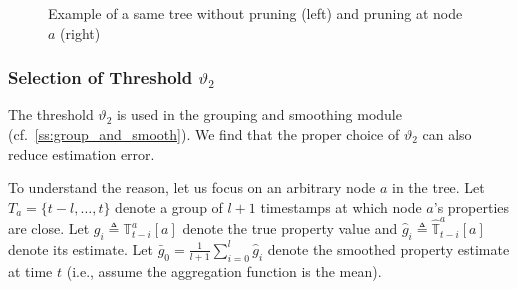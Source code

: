 \documentclass[acmsmall]{acmart}
\newcommand{\Tree}{\mathbb{T}}
\newcommand{\AT}{\Tree^a}
\newcommand{\hAT}{\hat{\Tree}^a}
\begin{document}
\begin{figure}[htp]


  \caption{Example of a same tree without pruning (left) and pruning at node $a$
  (right)}
  \label{fig:branch_of_tree}
\end{figure}




\subsubsection{Selection of Threshold $\vartheta_2$}

The threshold $\vartheta_2$ is used in the grouping and smoothing module
(cf.~\cref{ss:group_and_smooth}).
We find that the proper choice of $\vartheta_2$ can also reduce estimation error.

To understand the reason, let us focus on an arbitrary node $a$ in the tree.
Let $T_a=\{t-l,\ldots,t\}$ denote a group of $l+1$ timestamps at which node
$a$'s properties are close.
Let $g_i\triangleq\AT_{t-i}[a]$ denote the true property value and
$\hat{g}_i\triangleq\hAT_{t-i}[a]$ denote its estimate.
Let $\bar{g}_0=\frac{1}{l+1}\sum_{i=0}^{l}\hat{g}_i$ denote the smoothed
property estimate at time $t$ (i.e., assume the aggregation function is the mean).
\end{document}
